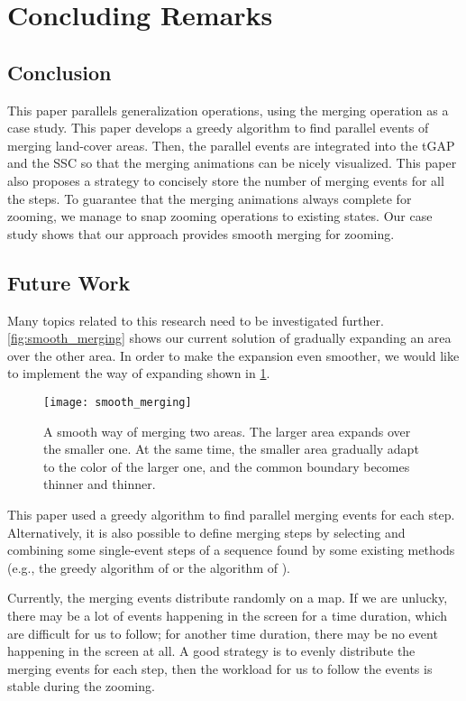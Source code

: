 \documentclass[ijgi,article,submit,moreauthors,pdftex]{Definitions/mdpi}
\begin{document}
\section{Concluding Remarks}
\label{sec:concluding_remarks}

\subsection{Conclusion}
This paper parallels generalization operations,
using the merging operation as a case study. 
This paper develops a greedy algorithm to find parallel events of 
merging land-cover areas.
Then, the parallel events are integrated into 
the tGAP and the SSC so that the merging animations can be nicely visualized.
This paper also proposes a strategy 
to concisely store the number of merging events for all the steps.
To guarantee that the merging animations always complete for zooming, 
we manage to snap zooming operations to existing states.
Our case study shows that 
our approach provides smooth merging for zooming.


\subsection{Future Work}

Many topics related to this research need to be investigated further.
\fig\ref{fig:smooth_merging} shows our current solution of
gradually expanding an area over the other area.
In order to make the expansion even smoother,
we would like to implement the way of expanding
shown in \fig\ref{fig:smooth_merging_future}.

\begin{figure}[tb]
\centering
\texttt{[image: smooth\_merging]}
\caption{A smooth way of merging two areas.
    The larger area expands over the smaller one.
    At the same time, 
    the smaller area gradually adapt to the color of the larger one,
    and the common boundary becomes thinner and thinner.}
\label{fig:smooth_merging_future}
\end{figure}

This paper used a greedy algorithm 
to find parallel merging events for each step.
Alternatively, it is also possible to define merging steps 
by selecting and combining some single-event steps of a sequence found 
by some existing methods
(e.g., the greedy algorithm of \citet{vanOosterom2005}
or the \Astar algorithm of \citet[]{Peng2019Thesis}).

Currently, the merging events distribute randomly on a map.
If we are unlucky, there may be a lot of events happening in the screen 
for a time duration,
which are difficult for us to follow;
for another time duration, there may be no event happening in the screen at all.
A good strategy is to evenly distribute the merging events for each step, 
then the workload for us to follow the events is stable during the zooming.
\end{document}
